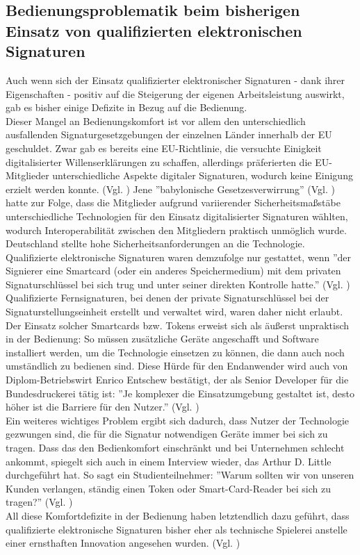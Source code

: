 \documentclass[deutsch]{lib/llncs/llncs}
\begin{document}
\subsection{Bedienungsproblematik beim bisherigen Einsatz von qualifizierten elektronischen Signaturen}
Auch wenn sich der Einsatz qualifizierter elektronischer Signaturen - dank ihrer Eigenschaften - positiv auf die Steigerung der eigenen Arbeitsleistung auswirkt, gab es bisher einige Defizite in Bezug auf die Bedienung. \\
Dieser Mangel an Bedienungskomfort ist vor allem den unterschiedlich ausfallenden Signaturgesetzgebungen der einzelnen Länder innerhalb der EU geschuldet. Zwar gab es bereits eine EU-Richtlinie, die versuchte Einigkeit digitalisierter Willenserklärungen zu schaffen, allerdings präferierten die EU-Mitglieder unterschiedliche Aspekte digitaler Signaturen, wodurch keine Einigung erzielt werden konnte. (Vgl. \cite[S. 30]{Zitat08}) Jene ''babylonische Gesetzesverwirrung'' (Vgl. \cite[S. 30]{Zitat08}) hatte zur Folge, dass die Mitglieder aufgrund variierender Sicherheitsmaßstäbe unterschiedliche Technologien für den Einsatz digitalisierter Signaturen wählten, wodurch Interoperabilität zwischen den Mitgliedern praktisch unmöglich wurde. \\
Deutschland stellte hohe Sicherheitsanforderungen an die Technologie. Qualifizierte elektronische Signaturen waren demzufolge nur gestattet, wenn ''der Signierer eine Smartcard (oder ein anderes Speichermedium) mit dem privaten Signaturschlüssel bei sich trug und unter seiner direkten Kontrolle hatte.'' (Vgl. \cite[S. 30]{Zitat08}) Qualifizierte Fernsignaturen, bei denen der private Signaturschlüssel bei der Signaturstellungseinheit erstellt und verwaltet wird, waren daher nicht erlaubt. \\
Der Einsatz solcher Smartcards bzw. Tokens erweist sich als äußerst unpraktisch in der Bedienung: So müssen zusätzliche Geräte angeschafft und Software installiert werden, um die Technologie einsetzen zu können, die dann auch noch umständlich zu bedienen sind. Diese Hürde für den Endanwender wird auch von Diplom-Betriebswirt Enrico Entschew bestätigt, der als Senior Developer für die Bundesdruckerei tätig ist: ''Je komplexer die Einsatzumgebung gestaltet ist, desto höher ist die Barriere für den Nutzer.'' (Vgl. \cite[S. 232]{Zitat09}) \\
Ein weiteres wichtiges Problem ergibt sich dadurch, dass Nutzer der Technologie gezwungen sind, die für die Signatur notwendigen Geräte immer bei sich zu tragen. Dass das den Bedienkomfort einschränkt und bei Unternehmen schlecht ankommt, spiegelt sich auch in einem Interview wieder, das Arthur D. Little durchgeführt hat. So sagt ein Studienteilnehmer: ''Warum sollten wir von unseren Kunden verlangen, ständig einen Token oder Smart-Card-Reader bei sich zu tragen?'' (Vgl. \cite[S. 5]{Zitat05}) \\
All diese Komfortdefizite in der Bedienung haben letztendlich dazu geführt, dass qualifizierte elektronische Signaturen bisher eher als technische Spielerei anstelle einer ernsthaften Innovation angesehen wurden.  (Vgl. \cite[S. 29]{Zitat08})
\end{document}
